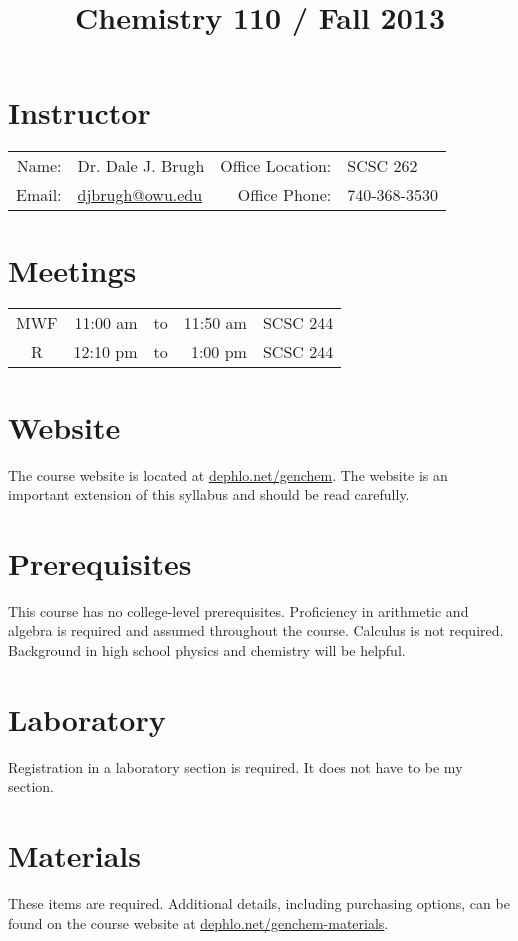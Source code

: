 \documentclass[letterpaper,oneside,onecolumn,11pt,article]{memoir}
\title{Chemistry 110 / Fall 2013}
\date{}
\author{}
\begin{document}
\maketitle
\thispagestyle{courseinformationtitle}

\section{Instructor}
\begin{tabular}{rl|rl}
Name: & Dr. Dale J. Brugh & Office Location: & SCSC 262 \\
Email: & \href{mailto:djbrugh@owu.edu}{djbrugh@owu.edu} & Office Phone: & 740-368-3530 \\
\end{tabular}

\section{Meetings}
\begin{tabular}{crcrl}
MWF & 11:00 am & to & 11:50 am & SCSC 244 \\
R & 12:10 pm & to & 1:00 pm & SCSC 244
\end{tabular}

\section{Website}
The course website is located at \href{http://dephlo.net/genchem}{dephlo.net/genchem}. The website is an important extension of this syllabus and should be read carefully. 

\section{Prerequisites}
This course has no college-level prerequisites. Proficiency in arithmetic and algebra is required and assumed throughout the course. Calculus is not required. Background in high school physics and chemistry will be helpful. 

\section{Laboratory}
Registration in a laboratory section is required. It does not have to be my section. 

\section{Materials}
These items are required. Additional details, including purchasing options, can be found on the course website at \href{http://dephlo.net/genchem-materials}{dephlo.net/genchem-materials}.
\end{document}

